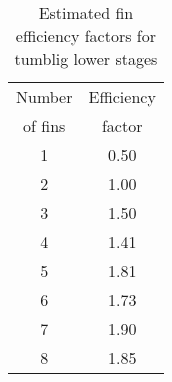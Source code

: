 \begin{table}
\caption{Estimated fin efficiency factors for tumblig lower stages}
\label{tab-lower-stage-fins}
\begin{center}
\begin{tabular}{cc}
Number  & Efficiency \\
of fins & factor     \\
\hline
1 & 0.50 \\
2 & 1.00 \\
3 & 1.50 \\
4 & 1.41 \\
5 & 1.81 \\
6 & 1.73 \\
7 & 1.90 \\
8 & 1.85 \\
\hline
\end{tabular}
\end{center}
\end{table}


